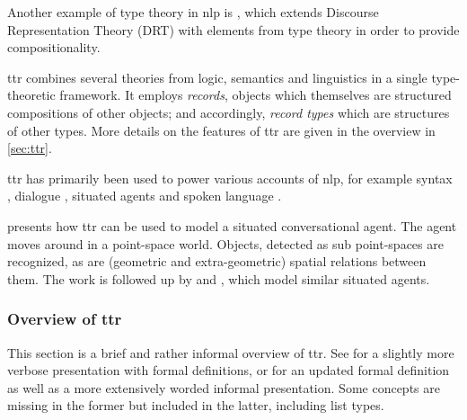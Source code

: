 Another example of type theory in \gls{nlp} is \cite{KohlhaseTypeTheoreticSemanticslDRT1996}, which extends Discourse Representation Theory (DRT) with elements from type theory in order to provide compositionality.



\Gls{ttr} \citep{CooperRecordsRecordTypes2005} combines several theories from logic, semantics and linguistics in a single type-theoretic framework.
It employs \textit{records}, objects which themselves are structured compositions of other objects;
and accordingly, \textit{record types} which are structures of other types.
More details on the features of \gls{ttr} are given in the overview in \autoref{sec:ttr}.

\gls{ttr} has primarily been used to power various accounts of \gls{nlp}, for example
syntax \citep{CooperAustiniantruthattitudes2005, CooperRecordsRecordTypes2005, CooperTypetheorysemantics2012, CooperTypetheorylanguage2016},
dialogue \citep{Larssonformalviewcorrective2009, LarssonDialoguesHaveContent2011, CooperTypetheorylanguage2016},
situated agents \citep{DobnikModellinglanguageaction2012, ttrspat,lspc} and
spoken language \citep{CooperTypetheorylanguage2016}.


\cite{DobnikModellinglanguageaction2012} presents how \gls{ttr} can be used to model a situated conversational agent.
The agent moves around in a point-space world.
Objects, detected as sub point-spaces are recognized, as are (geometric and extra-geometric) spatial relations between them.
The work is followed up by \cite{ttrspat} and \cite{lspc}, which model similar situated agents.




\subsubsection{Overview of \gls{ttr}}
\label{sec:ttr}

This section is a brief and rather informal overview of \gls{ttr}.
See \cite{CooperTypetheorysemantics2012} for a slightly more verbose presentation with formal definitions, or \cite{CooperTypetheorylanguage2016} for an updated formal definition as well as a more extensively worded informal presentation.
Some concepts are missing in the former but included in the latter, including list types.

